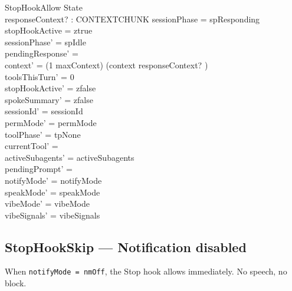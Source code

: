 \documentclass[a4paper,10pt,fleqn]{article}
\begin{document}
\begin{schema}{StopHookAllow}
  \Delta State \\
  responseContext? : CONTEXTCHUNK
  \where
  sessionPhase = spResponding \\
  stopHookActive = ztrue \\
  sessionPhase' = spIdle \\
  pendingResponse' = \emptyset \\
  context' = (1 \upto maxContext) \dres (context \cat \langle responseContext? \rangle) \\
  toolsThisTurn' = 0 \\
  stopHookActive' = zfalse \\
  spokeSummary' = zfalse \\
  sessionId' = sessionId \\
  permMode' = permMode \\
  toolPhase' = tpNone \\
  currentTool' = \emptyset \\
  activeSubagents' = activeSubagents \\
  pendingPrompt' = \emptyset \\
  notifyMode' = notifyMode \\
  speakMode' = speakMode \\
  vibeMode' = vibeMode \\
  vibeSignals' = vibeSignals
\end{schema}

\subsection{StopHookSkip --- Notification disabled}

When \texttt{notifyMode = nmOff}, the Stop hook allows immediately.
No speech, no block.
\end{document}
